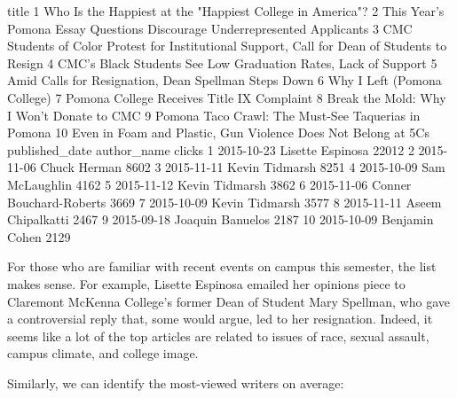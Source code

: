 \documentclass[a4paper]{article}
\begin{document}
\begin{Schunk}
\begin{Soutput}
                                                                                          title
1                                     Who Is the Happiest at the "Happiest College in America"?
2                     This Year's Pomona Essay Questions Discourage Underrepresented Applicants
3  CMC Students of Color Protest for Institutional Support, Call for Dean of Students to Resign
4                                CMC’s Black Students See Low Graduation Rates, Lack of Support
5                                          Amid Calls for Resignation, Dean Spellman Steps Down
6                                                                   Why I Left (Pomona College)
7                                                    Pomona College Receives Title IX Complaint
8                                                     Break the Mold: Why I Won’t Donate to CMC
9                                           Pomona Taco Crawl: The Must-See Taquerias in Pomona
10                               Even in Foam and Plastic, Gun  Violence Does Not Belong at 5Cs
   published_date             author_name clicks
1      2015-10-23        Lisette Espinosa  22012
2      2015-11-06            Chuck Herman   8602
3      2015-11-11          Kevin Tidmarsh   8251
4      2015-10-09          Sam McLaughlin   4162
5      2015-11-12          Kevin Tidmarsh   3862
6      2015-11-06 Conner Bouchard-Roberts   3669
7      2015-10-09          Kevin Tidmarsh   3577
8      2015-11-11       Aseem Chipalkatti   2467
9      2015-09-18        Joaquin Banuelos   2187
10     2015-10-09          Benjamin Cohen   2129
\end{Soutput}
\end{Schunk}


For those who are familiar with recent events on campus this semester, the list makes sense. For example, Lisette Espinosa emailed her opinions piece to Claremont McKenna College's former Dean of Student Mary Spellman, who gave a controversial reply that, some would argue, led to her resignation. Indeed, it seems like a lot of the top articles are related to issues of race, sexual assault, campus climate, and college image. 

Similarly, we can identify the most-viewed writers on average:
\end{document}
